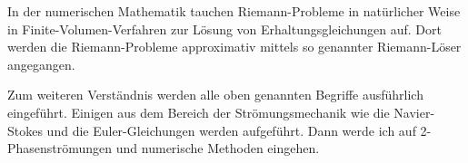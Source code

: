 In der numerischen Mathematik tauchen Riemann-Probleme in natürlicher
Weise in Finite-Volumen-Verfahren zur Lösung von Erhaltungsgleichungen
auf. Dort werden die Riemann-Probleme approximativ mittels so
genannter Riemann-Löser angegangen.

Zum weiteren Verständnis werden alle oben genannten Begriffe
ausführlich eingeführt. Einigen aus dem Bereich der Strömungsmechanik
wie die Navier-Stokes und die Euler-Gleichungen werden
aufgeführt. Dann werde ich auf 2-Phasenströmungen und numerische
Methoden eingehen.

